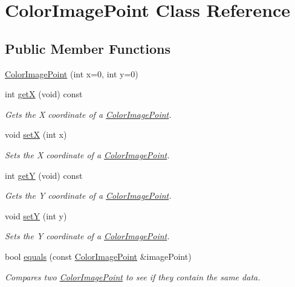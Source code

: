 \hypertarget{class_color_image_point}{\section{\-Color\-Image\-Point \-Class \-Reference}
\label{class_color_image_point}
}
\subsection*{\-Public \-Member \-Functions}
\begin{DoxyCompactItemize}
\item 
\hyperlink{class_color_image_point_af165b5f45b5c05e3d720376a0011f7c3}{\-Color\-Image\-Point} (int x=0, int y=0)
\item 
int \hyperlink{class_color_image_point_a1736c098649722642c4b627202c896f8}{get\-X} (void) const 
\begin{DoxyCompactList}\small\item\em \-Gets the \-X coordinate of a \hyperlink{class_color_image_point}{\-Color\-Image\-Point}. \end{DoxyCompactList}\item 
void \hyperlink{class_color_image_point_a0a7b98e6076a72d52f7fb29cf51a1633}{set\-X} (int x)
\begin{DoxyCompactList}\small\item\em \-Sets the \-X coordinate of a \hyperlink{class_color_image_point}{\-Color\-Image\-Point}. \end{DoxyCompactList}\item 
int \hyperlink{class_color_image_point_ae07402fd2f292ccd4acb3b767fb82f09}{get\-Y} (void) const 
\begin{DoxyCompactList}\small\item\em \-Gets the \-Y coordinate of a \hyperlink{class_color_image_point}{\-Color\-Image\-Point}. \end{DoxyCompactList}\item 
void \hyperlink{class_color_image_point_a3524b7e61926b0150f89d05246d9b414}{set\-Y} (int y)
\begin{DoxyCompactList}\small\item\em \-Sets the \-Y coordinate of a \hyperlink{class_color_image_point}{\-Color\-Image\-Point}. \end{DoxyCompactList}\item 
bool \hyperlink{class_color_image_point_a60b0e8b3b9fce04835712a879c99ca2f}{equals} (const \hyperlink{class_color_image_point}{\-Color\-Image\-Point} \&image\-Point)
\begin{DoxyCompactList}\small\item\em \-Compares two \hyperlink{class_color_image_point}{\-Color\-Image\-Point} to see if they contain the same data. \end{DoxyCompactList}\end{DoxyCompactItemize}


